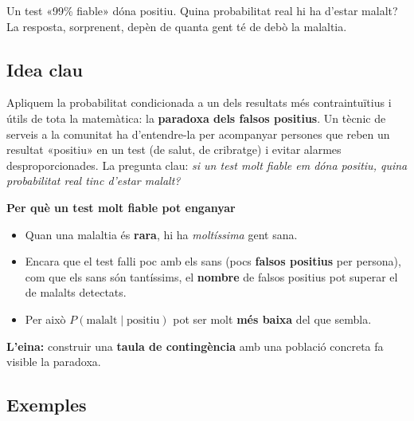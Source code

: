 %
{Un test «99\% fiable» dóna positiu. Quina probabilitat real hi ha d'estar malalt? La resposta, sorprenent, depèn de quanta gent té de debò la malaltia.}

\subsection{Idea clau}

Apliquem la probabilitat condicionada a un dels resultats més contraintuïtius i útils de
tota la matemàtica: la \textbf{paradoxa dels falsos positius}. Un tècnic de serveis a la
comunitat ha d'entendre-la per acompanyar persones que reben un resultat «positiu» en un
test (de salut, de cribratge) i evitar alarmes desproporcionades. La pregunta clau:
\emph{si un test molt fiable em dóna positiu, quina probabilitat real tinc d'estar
malalt?}

\begin{idea}
\textbf{Per què un test molt fiable pot enganyar}
\begin{itemize}[leftmargin=1.4em, itemsep=2pt]
  \item Quan una malaltia és \textbf{rara}, hi ha \emph{moltíssima} gent sana.
  \item Encara que el test falli poc amb els sans (pocs \textbf{falsos positius} per
        persona), com que els sans són tantíssims, el \textbf{nombre} de falsos positius
        pot superar el de malalts detectats.
  \item Per això $P(\text{malalt}\mid\text{positiu})$ pot ser molt \textbf{més baixa} del
        que sembla.
\end{itemize}
\textbf{L'eina:} construir una \textbf{taula de contingència} amb una població concreta
fa visible la paradoxa.
\end{idea}

\subsection{Exemples}

